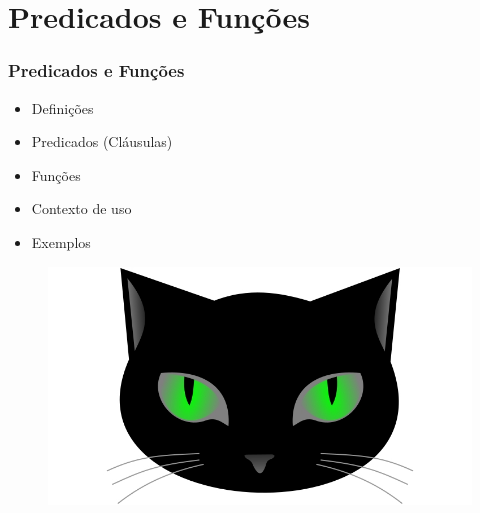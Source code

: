 \section{Predicados e Funções}

\begin{frame}
\frametitle{Predicados e Funções}
\begin{minipage}{0.47\textwidth}
    \begin{itemize}
        \item Definições
        \item Predicados (Cláusulas)
        \item Funções 
        \item Contexto de uso
        \item Exemplos        
    \end{itemize}
\end{minipage}
\begin{minipage}{0.5\textwidth}
\begin{figure}[ht!]
\begin{center}
\includegraphics[width=1.2\textwidth, height=0.40\textheight]{figures/logo_picat_alex.jpg}
\end{center}
\end{figure}
\end{minipage}
\end{frame}


